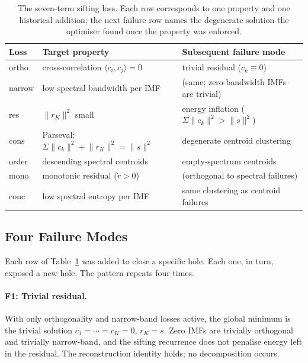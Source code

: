\documentclass[journal]{IEEEtran}
\theoremstyle{remark}
\begin{document}
\begin{table}[t]
\centering
\caption{The seven-term sifting loss. Each row corresponds to one
property and one historical addition; the next failure row names the
degenerate solution the optimiser found once the property was
enforced.}
\label{tab:sifting-losses}
\setlength{\tabcolsep}{3pt}
\begin{tabular}{@{}p{}p{}p{}@{}}
\toprule
Loss            & Target property                     & Subsequent failure mode \\
\midrule
ortho           & cross-correlation $\langle c_{i}, c_{j}\rangle\!=\!0$ &
                  trivial residual ($c_{k}\!\equiv\!0$) \\
narrow          & low spectral bandwidth per IMF       &
                  (same; zero-bandwidth IMFs are trivial)\\
res             & $\|r_{K}\|^{2}$ small                 &
                  energy inflation ($\Sigma\|c_{k}\|^{2}\!>\!\|s\|^{2}$)\\
cons            & Parseval: $\Sigma\|c_{k}\|^{2}\!+\!\|r_{K}\|^{2}\!=\!\|s\|^{2}$ &
                  degenerate centroid clustering \\
order           & descending spectral centroids        &
                  empty-spectrum centroids \\
mono            & monotonic residual ($\dot r\!>\!0$)      &
                  (orthogonal to spectral failures) \\
conc            & low spectral entropy per IMF           &
                  same clustering as centroid failures \\
\bottomrule
\end{tabular}
\end{table}

\subsection{Four Failure Modes}
\label{subsec:failures}

Each row of Table~\ref{tab:sifting-losses} was added to close a
specific hole. Each one, in turn, exposed a new hole. The pattern
repeats four times.

\paragraph{F1: Trivial residual.}
With only orthogonality and narrow-band losses active, the global
minimum is the trivial solution
$c_{1} = \cdots = c_{K} = 0$, $r_{K} = s$. Zero IMFs are trivially
orthogonal and trivially narrow-band, and the sifting recurrence does
not penalise energy left in the residual. The reconstruction identity
holds; no decomposition occurs.
\end{document}

